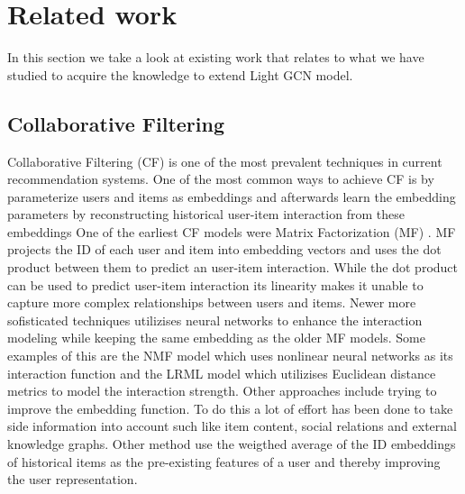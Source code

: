 \section{Related work}
In this section we take a look at existing work that relates to what we have studied to acquire the knowledge to extend Light GCN model.

\subsection{Collaborative Filtering}
Collaborative Filtering (CF) is one of the most prevalent techniques in current recommendation systems\cite{YT_rec,NGCF_2019,Pint_rec,COL_MEM_NET}.
One of the most common ways to achieve CF is by parameterize users and items as embeddings and afterwards learn the embedding parameters by reconstructing historical user-item interaction from these embeddings\cite{NGCF_2019}
One of the earliest CF models were Matrix Factorization (MF) \cite{Matrix-factorization-techniques, BAY_PER_RAN}.
MF  projects the ID of each user and item into embedding vectors and uses the dot product between them to predict an user-item interaction.
While the dot product can be used to predict user-item interaction its linearity makes it unable to capture more complex relationships between users and items.
Newer more sofisticated techniques utilizises neural networks to enhance the interaction modeling while keeping the same embedding as the older MF models.
Some examples of this are the NMF model\cite{NEU_COL_FIL} which uses nonlinear neural networks as its interaction function and the LRML model\cite{LAT_REL_MET} which utilizises Euclidean distance metrics to model the interaction strength.
Other approaches include trying to improve the embedding function.
To do this a lot of effort has been done to take side information into account such like item content\cite{ATT_COL_FIL_MUL}, social relations\cite{REC_SOC_USE} and external knowledge graphs\cite{KGAT, KNO_GRA_REC}.
Other method use the weigthed average of the ID embeddings of historical items as the pre-existing features of a user and thereby improving the user representation\cite{SVD_PLUSPLUS,FISM}.
 
